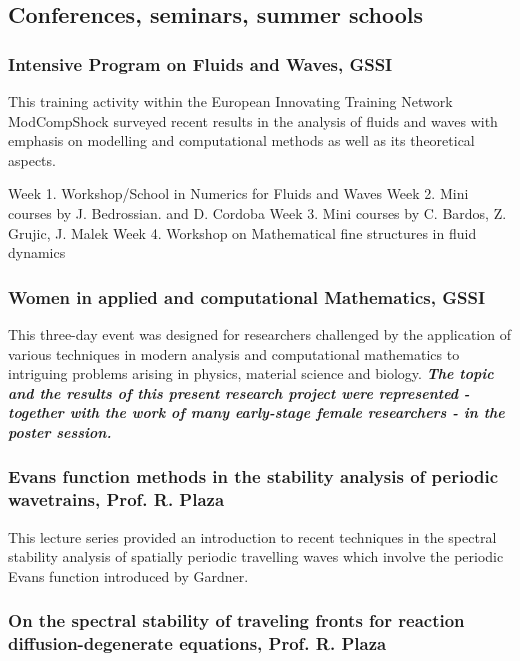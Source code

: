 \documentclass{article}
\begin{document}
\subsection{Conferences, seminars, summer schools}

\subsubsection{Intensive Program on Fluids and Waves, GSSI}

This training activity within the European Innovating Training Network ModCompShock surveyed recent results in the analysis of fluids and waves with emphasis on modelling and computational methods as well as its theoretical aspects.

\begin{outline}[enumerate]
  \1 Week 1. Workshop/School in Numerics for Fluids and Waves
  \1 Week 2. Mini courses by J. Bedrossian. and D. Cordoba
  \1 Week 3. Mini courses by C. Bardos, Z. Grujic, J. Malek
  \1 Week 4. Workshop on Mathematical fine structures in fluid dynamics
\end{outline}

\subsubsection{Women in applied and computational Mathematics, GSSI}

This three-day event was designed for researchers challenged by the application of various techniques in modern analysis and computational mathematics to intriguing problems arising in physics, material science and biology. \textbf{\textit{The topic and the results of this present research project were represented - together with the work of many early-stage female researchers - in the poster session.}}

\subsubsection{Evans function methods in the stability analysis of periodic wavetrains, Prof. R. Plaza}

This lecture series provided an introduction to recent techniques in the spectral stability analysis of spatially periodic travelling waves which involve the periodic Evans function introduced by Gardner.

\subsubsection{On the spectral stability of traveling fronts for reaction diffusion-degenerate equations, Prof. R. Plaza}
\end{document}
